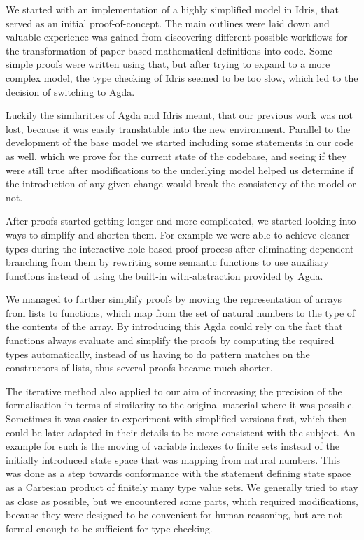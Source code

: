 We started with an implementation of a highly simplified model in Idris, that served as an initial proof-of-concept. The main outlines were laid down and valuable experience was gained from discovering different possible workflows for the transformation of paper based mathematical definitions into code. Some simple proofs were written using that, but after trying to expand to a more complex model, the type checking of Idris seemed to be too slow, which led to the decision of switching to Agda.

Luckily the similarities of Agda and Idris meant, that our previous work was not lost, because it was easily translatable into the new environment. Parallel to the development of the base model we started including some statements in our code as well, which we prove for the current state of the codebase, and seeing if they were still true after modifications to the underlying model helped us determine if the introduction of any given change would break the consistency of the model or not.

After proofs started getting longer and more complicated, we started looking into ways to simplify and shorten them. For example we were able to achieve cleaner types during the interactive hole based proof process after eliminating dependent branching from them by rewriting some semantic functions to use auxiliary functions instead of using the built-in with-abstraction provided by Agda.

We managed to further simplify proofs by moving the representation of arrays from lists to functions, which map from the set of natural numbers to the type of the contents of the array. By introducing this Agda could rely on the fact that functions always evaluate and simplify the proofs by computing the required types automatically, instead of us having to do pattern matches on the constructors of lists, thus several proofs became much shorter.

The iterative method also applied to our aim of increasing the precision of the formalisation in terms of similarity to the original material where it was possible. Sometimes it was easier to experiment with simplified versions first, which then could be later adapted in their details to be more consistent with the subject. An example for such is the moving of variable indexes to finite sets instead of the initially introduced state space that was mapping from natural numbers. This was done as a step towards conformance with the statement defining state space as a Cartesian product of finitely many type value sets. We generally tried to stay as close as possible, but we encountered some parts, which required modifications, because they were designed to be convenient for human reasoning, but are not formal enough to be sufficient for type checking.

